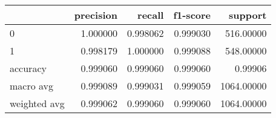 \begin{tabular}{lrrrr}
\toprule
{} &  precision &    recall &  f1-score &     support \\
\midrule
0            &   1.000000 &  0.998062 &  0.999030 &   516.00000 \\
1            &   0.998179 &  1.000000 &  0.999088 &   548.00000 \\
accuracy     &   0.999060 &  0.999060 &  0.999060 &     0.99906 \\
macro avg    &   0.999089 &  0.999031 &  0.999059 &  1064.00000 \\
weighted avg &   0.999062 &  0.999060 &  0.999060 &  1064.00000 \\
\bottomrule
\end{tabular}

